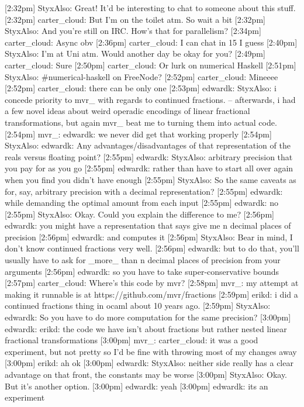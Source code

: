 \documentclass{beamer}
\begin{document}
[2:32pm] StyxAlso: Great! It’d be interesting to chat to someone about this stuff.
[2:32pm] carter_cloud: But I'm on the toilet atm. So wait a bit
[2:32pm] StyxAlso: And you’re still on IRC. How’s that for parallelism?
[2:34pm] carter_cloud: Async obv
[2:36pm] carter_cloud: I can chat in 15 I guess
[2:40pm] StyxAlso: I’m at Uni atm. Would another day be okay for you?
[2:49pm] carter_cloud: Sure
[2:50pm] carter_cloud: Or lurk on numerical Haskell
[2:51pm] StyxAlso: #numerical-haskell on FreeNode?
[2:52pm] carter_cloud: Mineeee
[2:52pm] carter_cloud: there can be only one
[2:53pm] edwardk: StyxAlso: i concede priority to mvr_ with regards to continued fractions. -- afterwards, i had a few novel ideas about weird operadic encodings of linear fractional transformations, but again mvr_ beat me to turning them into actual code.
[2:54pm] mvr_: edwardk: we never did get that working properly
[2:54pm] StyxAlso: edwardk: Any advantages/disadvantages of that representation of the reals versus floating point?
[2:55pm] edwardk: StyxAlso: arbitrary precision that you pay for as you go
[2:55pm] edwardk: rather than have to start all over again when you find you didn't have enough
[2:55pm] StyxAlso: So the same caveats as for, say, arbitrary precision with a decimal representation?
[2:55pm] edwardk: while demanding the optimal amount from each input
[2:55pm] edwardk: no
[2:55pm] StyxAlso: Okay. Could you explain the difference to me?
[2:56pm] edwardk: you might have a representation that says give me n decimal places of precision
[2:56pm] edwardk: and computes it
[2:56pm] StyxAlso: Bear in mind, I don’t know continued fractions very well.
[2:56pm] edwardk: but to do that, you'll usually have to ask for _more_ than n decimal places of precision from your arguments
[2:56pm] edwardk: so you have to take super-conservative bounds
[2:57pm] carter_cloud: Where's this code by mvr?
[2:58pm] mvr_: my attempt at making it runnable is at https://github.com/mvr/fractions
[2:59pm] erikd: i did a continued fractions thing in ocaml about 10 years ago.
[2:59pm] StyxAlso: edwardk: So you have to do more computation for the same precision?
[3:00pm] edwardk: erikd: the code we have isn't about fractions but rather nested linear fractional transformations
[3:00pm] mvr_: carter_cloud: it was a good experiment, but not pretty so I'd be fine with throwing most of my changes away
[3:00pm] erikd: ah ok
[3:00pm] edwardk: StyxAlso: neither side really has a clear advantage on that front, the constants may be worse
[3:00pm] StyxAlso: Okay. But it’s another option.
[3:00pm] edwardk: yeah
[3:00pm] edwardk: its an experiment
\end{document}
